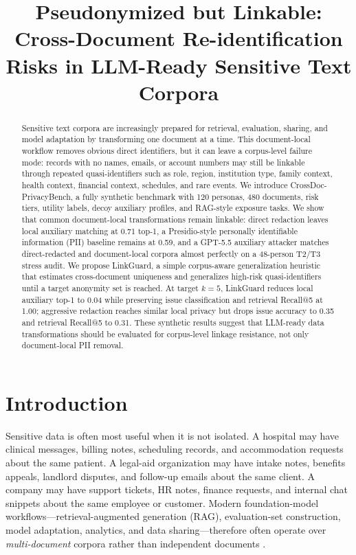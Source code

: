 \documentclass{article}
\title{Pseudonymized but Linkable:\\
Cross-Document Re-identification Risks in LLM-Ready Sensitive Text Corpora}
\author{}
\date{}
\newcommand{\method}{LinkGuard}
\newcommand{\bench}{CrossDoc-PrivacyBench}
\begin{document}
\ifcolmsubmission
\linenumbers
\fi
\maketitle

\begin{abstract}
Sensitive text corpora are increasingly prepared for retrieval, evaluation, sharing, and model adaptation by transforming one document at a time.
This document-local workflow removes obvious direct identifiers, but it can leave a corpus-level failure mode: records with no names, emails, or account numbers may still be linkable through repeated quasi-identifiers such as role, region, institution type, family context, health context, financial context, schedules, and rare events.
We introduce \bench, a fully synthetic benchmark with 120 personas, 480 documents, risk tiers, utility labels, decoy auxiliary profiles, and RAG-style exposure tasks.
We show that common document-local transformations remain linkable: direct redaction leaves local auxiliary matching at 0.71 top-1, a Presidio-style personally identifiable information (PII) baseline remains at 0.59, and a GPT-5.5 auxiliary attacker matches direct-redacted and document-local corpora almost perfectly on a 48-person T2/T3 stress audit.
We propose \method, a simple corpus-aware generalization heuristic that estimates cross-document uniqueness and generalizes high-risk quasi-identifiers until a target anonymity set is reached.
At target $k=5$, \method{} reduces local auxiliary top-1 to 0.04 while preserving issue classification and retrieval Recall@5 at 1.00; aggressive redaction reaches similar local privacy but drops issue accuracy to 0.35 and retrieval Recall@5 to 0.31.
These synthetic results suggest that LLM-ready data transformations should be evaluated for corpus-level linkage resistance, not only document-local PII removal.
\end{abstract}

\section{Introduction}

Sensitive data is often most useful when it is not isolated.
A hospital may have clinical messages, billing notes, scheduling records, and accommodation requests about the same patient.
A legal-aid organization may have intake notes, benefits appeals, landlord disputes, and follow-up emails about the same client.
A company may have support tickets, HR notes, finance requests, and internal chat snippets about the same employee or customer.
Modern foundation-model workflows---retrieval-augmented generation (RAG), evaluation-set construction, model adaptation, analytics, and data sharing---therefore often operate over \emph{multi-document} corpora rather than independent documents \citep{lewis2020rag,zeng2024ragprivacy,jiang2024ragthief}.
\end{document}
